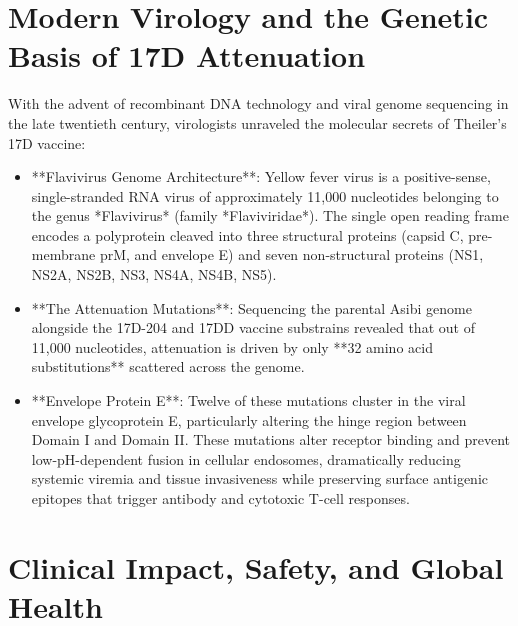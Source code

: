\section{Modern Virology and the Genetic Basis of 17D Attenuation}

With the advent of recombinant DNA technology and viral genome sequencing in the late twentieth century, virologists unraveled the molecular secrets of Theiler's 17D vaccine:
\begin{itemize}
    \item **Flavivirus Genome Architecture**: Yellow fever virus is a positive-sense, single-stranded RNA virus of approximately 11,000 nucleotides belonging to the genus *Flavivirus* (family *Flaviviridae*). The single open reading frame encodes a polyprotein cleaved into three structural proteins (capsid C, pre-membrane prM, and envelope E) and seven non-structural proteins (NS1, NS2A, NS2B, NS3, NS4A, NS4B, NS5).
    \item **The Attenuation Mutations**: Sequencing the parental Asibi genome alongside the 17D-204 and 17DD vaccine substrains revealed that out of 11,000 nucleotides, attenuation is driven by only **32 amino acid substitutions** scattered across the genome.
    \item **Envelope Protein E**: Twelve of these mutations cluster in the viral envelope glycoprotein E, particularly altering the hinge region between Domain I and Domain II. These mutations alter receptor binding and prevent low-pH-dependent fusion in cellular endosomes, dramatically reducing systemic viremia and tissue invasiveness while preserving surface antigenic epitopes that trigger antibody and cytotoxic T-cell responses.
\end{itemize}

\section{Clinical Impact, Safety, and Global Health}

